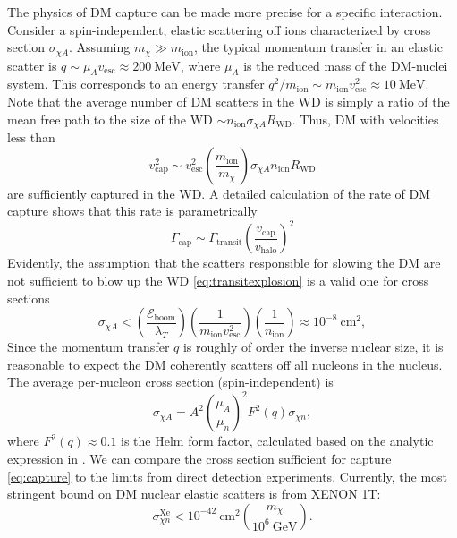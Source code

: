 \documentclass[preprintnumbers,amsmath,amssymb,prd,superscriptaddress]{revtex4}
\newcommand{\Eboom}{\mathcal{E}_\text{boom}}
\newcommand{\GeV}{\text{GeV}}
\newcommand{\MeV}{\text{MeV}}
\newcommand{\cm}{\text{cm}}
\def\r{\right)}
\def\l{\left(}
\begin{document}
The physics of DM capture can be made more precise for a specific interaction.
Consider a spin-independent, elastic scattering off ions characterized by cross section $\sigma_{\chi A}$. 
Assuming $m_\chi \gg m_\text{ion}$, the typical momentum transfer in an elastic scatter is $q \sim \mu_{A} v_\text{esc} \approx 200 ~\MeV$, where $\mu_{A}$ is the reduced mass of the DM-nuclei system. 
This corresponds to an energy transfer $q^2/m_\text{ion} \sim m_\text{ion} v_\text{esc}^2 \approx 10 ~\MeV$. 
Note that the average number of DM scatters in the WD is simply a ratio of the mean free path to the size of the WD $\sim n_\text{ion} \sigma_{\chi A} R_\text{WD}$. 
Thus, DM with velocities less than
\begin{equation}
\label{eq:capture}
v_\text{cap}^2 \sim v_\text{esc}^2 \l \frac{m_\text{ion}}{m_\chi} \r \sigma_{\chi A} n_\text{ion} R_\text{WD} 
\end{equation}
are sufficiently captured in the WD. 
A detailed calculation of the rate of DM capture \cite{Gould} shows that this rate is parametrically
\begin{equation}
\Gamma_\text{cap} \sim \Gamma_\text{transit} \l \frac{v_\text{cap}}{v_\text{halo}} \r^2
\end{equation}
Evidently, the assumption that the scatters responsible for slowing the DM are not sufficient to blow up the WD \eqref{eq:transitexplosion} is a valid one for cross sections
\begin{equation}
\sigma_{\chi A} < \l \frac{\Eboom}{\lambda_T} \r \l \frac{1}{m_\text{ion} v_\text{esc}^2} \r \l \frac{1}{n_\text{ion}} \r \approx 10^{-8} ~\cm^2,
\end{equation}
Since the momentum transfer $q$ is roughly of order the inverse nuclear size, it is reasonable to expect the DM coherently scatters off all nucleons in the nucleus. 
The average per-nucleon cross section (spin-independent) is
\begin{equation}
\sigma_{\chi A} = A^2 \l \frac{\mu_{A}}{\mu_{n}}\r^2 F^2(q) \sigma_{\chi n},
\end{equation}
where $F^2(q) \approx 0.1$ is the Helm form factor, calculated based on the analytic expression in \cite{LUX thesis}. 
We can compare the cross section sufficient for capture \eqref{eq:capture} to the limits from direct detection experiments.
Currently, the most stringent bound on DM nuclear elastic scatters is from XENON 1T:
\begin{equation}
\label{eq:xenon}
\sigma^\text{Xe}_{\chi n} < 10^{-42} ~\text{cm}^2 \l \frac{m_\chi}{10^6 ~\GeV} \r.
\end{equation}
\end{document}
